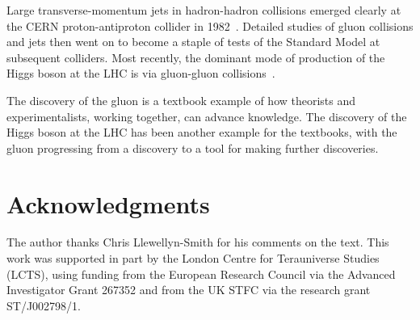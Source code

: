 \documentclass[12pt]{article} %
\begin{document}
Large transverse-momentum jets in hadron-hadron collisions emerged clearly at the CERN
proton-antiproton collider in 1982~\cite{UA2}. Detailed studies of gluon collisions and jets then went
on to become a staple of tests of the Standard Model at subsequent colliders. Most recently,
the dominant mode of production of the Higgs boson at the LHC is via gluon-gluon
collisions~\cite{H}.

The discovery of the gluon is a textbook example of how theorists and experimentalists,
working together, can advance knowledge. The discovery of the Higgs boson at the LHC
has been another example for the textbooks, with the gluon progressing from a discovery
to a tool for making further discoveries. 

\section*{Acknowledgments}
The author thanks Chris Llewellyn-Smith for his comments on the text.
This work was supported in part by the London Centre for Terauniverse Studies
(LCTS), using funding from the European Research Council via the Advanced Investigator
Grant 267352 and from the UK STFC via the research grant ST/J002798/1.
\end{document}
